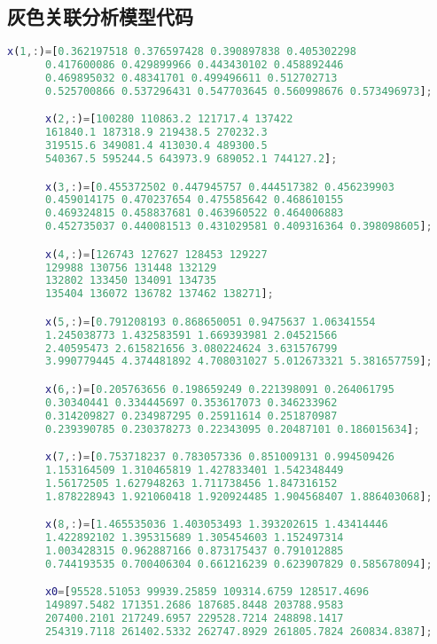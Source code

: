   \subsection{灰色关联分析模型代码}
    \begin{lstlisting}[language=MATLAB]
      x(1,:)=[0.362197518 0.376597428 0.390897838 0.405302298 
      0.417600086 0.429899966 0.443430102 0.458892446 
      0.469895032 0.48341701 0.499496611 0.512702713 
      0.525700866 0.537296431 0.547703645 0.560998676 0.573496973];

      x(2,:)=[100280 110863.2 121717.4 137422 
      161840.1 187318.9 219438.5 270232.3 
      319515.6 349081.4 413030.4 489300.5 
      540367.5 595244.5 643973.9 689052.1 744127.2];

      x(3,:)=[0.455372502 0.447945757 0.444517382 0.456239903 
      0.459014175 0.470237654 0.475585642 0.468610155 
      0.469324815 0.458837681 0.463960522 0.464006883 
      0.452735037 0.440081513 0.431029581 0.409316364 0.398098605];

      x(4,:)=[126743 127627 128453 129227 
      129988 130756 131448 132129 
      132802 133450 134091 134735 
      135404 136072 136782 137462 138271];

      x(5,:)=[0.791208193 0.868650051 0.9475637 1.06341554 
      1.245038773 1.432583591 1.669393981 2.04521566 
      2.40595473 2.615821656 3.080224624 3.631576799 
      3.990779445 4.374481892 4.708031027 5.012673321 5.381657759];

      x(6,:)=[0.205763656 0.198659249 0.221398091 0.264061795 
      0.30340441 0.334445697 0.353617073 0.346233962 
      0.314209827 0.234987295 0.25911614 0.251870987 
      0.239390785 0.230378273 0.22343095 0.20487101 0.186015634];

      x(7,:)=[0.753718237 0.783057336 0.851009131 0.994509426 
      1.153164509 1.310465819 1.427833401 1.542348449 
      1.56172505 1.627948263 1.711738456 1.847316152 
      1.878228943 1.921060418 1.920924485 1.904568407 1.886403068];

      x(8,:)=[1.465535036 1.403053493 1.393202615 1.43414446 
      1.422892102 1.395315689 1.305454603 1.152497314 
      1.003428315 0.962887166 0.873175437 0.791012885 
      0.744193535 0.700406304 0.661216239 0.623907829 0.585678094];

      x0=[95528.51053 99939.25859 109314.6759 128517.4696 
      149897.5482 171351.2686 187685.8448 203788.9583 
      207400.2101 217249.6957 229528.7214 248898.1417 
      254319.7118 261402.5332 262747.8929 261805.7824 260834.8387];


\end{lstlisting}
